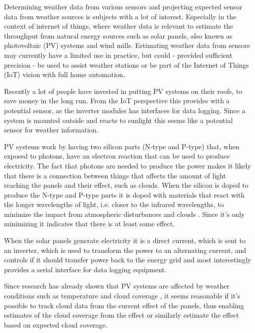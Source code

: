 Determining weather data from various sensors and projecting expected
sensor data from weather sources is subjects with a lot of interest.
Especially in the context of internet of things, where weather data is
relevant to estimate the throughput from natural energy sources such
as solar panels, also known as photovoltaic (PV) systems and wind
mills.  Estimating weather data from sensors may currently have a
limited use in practice, but could - provided sufficient precision -
be used to assist weather stations or be part of the Internet of
Things (IoT) vision with full home automation.

Recently a lot of people have invested in putting PV systems on their
roofs, to save money in the long run.  From the IoT perspective this
provides with a potential sensor, as the inverter modules has
interfaces for data logging.  Since a system is mounted outside and
reacts to sunlight this seems like a potential sensor for weather
information.

PV systems work by having two silicon parts (N-type and P-type) that,
when exposed to photons, have an electron reaction that can be used to
produce electricity.  The fact that photons are needed to produce the
power makes it likely that there is a connection between things that
affects the amount of light reaching the panels and their effect, such
as clouds.  When the silicon is doped to produce the N-type and P-type
parts it is doped with materials that react with the longer
wavelengths of light, i.e. closer to the infrared wavelengths, to
minimize the impact from atmospheric disturbances and clouds
\citep{photovoltaic}.  Since it's only minimizing it indicates that
there is at least some effect.

When the solar panels generate electricity it is a direct current,
which is sent to an inverter, which is used to transform the power to
an alternating current, and controls if it should transfer power back
to the energy grid and most interestingly provides a serial interface
for data logging equipment.

Since research has already shown that PV systems are affected by
weather conditions such as temperature and cloud coverage
\citep{mppt2004,southafrica,cloudTrack}, it seems reasonable if it's
possible to track cloud data from the current effect of the panels,
thus enabling estimates of the cloud coverage from the effect or
similarly estimate the effect based on expected cloud coverage.


